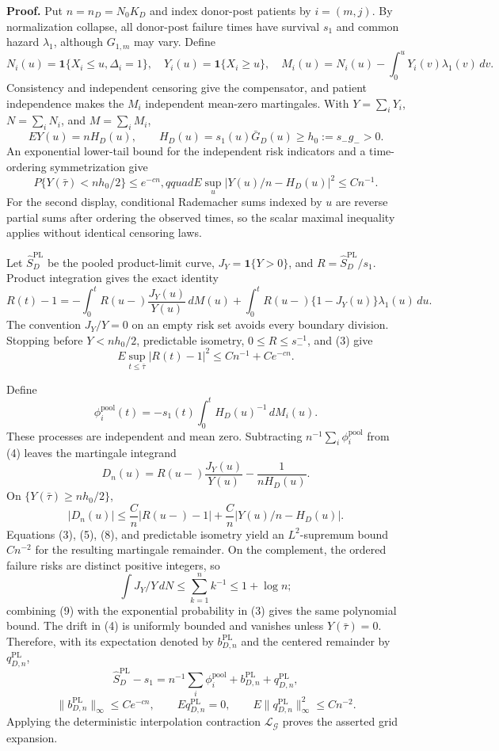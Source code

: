 \textbf{Proof.}
Put \(n=n_D=N_0K_D\) and index donor-post patients by \(i=(m,j)\). By normalization collapse, all donor-post failure times have survival \(s_1\) and common hazard \(\lambda_1\), although \(G_{1,m}\) may vary. Define
\[
 N_i(u)=\mathbf1\{X_i\le u,\Delta_i=1\},\quad
 Y_i(u)=\mathbf1\{X_i\ge u\},\quad
 M_i(u)=N_i(u)-\int_0^uY_i(v)\lambda_1(v)\,dv.            \tag{1}
\]
Consistency and independent censoring give the compensator, and patient independence makes the \(M_i\) independent mean-zero martingales. With \(Y=\sum_iY_i\), \(N=\sum_iN_i\), and \(M=\sum_iM_i\),
\[
 EY(u)=nH_D(u),\qquad H_D(u)=s_1(u)\bar G_D(u)\ge h_0:=s_-g_->0. \tag{2}
\]
An exponential lower-tail bound for the independent risk indicators and a time-ordering symmetrization give
\[
 P\{Y(\bar\tau)<nh_0/2\}\le e^{-cn},qquad
 E\sup_u|Y(u)/n-H_D(u)|^2\le Cn^{-1}.                    \tag{3}
\]
For the second display, conditional Rademacher sums indexed by \(u\) are reverse partial sums after ordering the observed times, so the scalar maximal inequality applies without identical censoring laws.

Let \(\widehat S_D^{\mathrm{PL}}\) be the pooled product-limit curve, \(J_Y=\mathbf1\{Y>0\}\), and \(R=\widehat S_D^{\mathrm{PL}}/s_1\). Product integration gives the exact identity
\[
 R(t)-1=-\int_0^tR(u-)\frac{J_Y(u)}{Y(u)}\,dM(u)
 +\int_0^tR(u-)\{1-J_Y(u)\}\lambda_1(u)\,du.             \tag{4}
\]
The convention \(J_Y/Y=0\) on an empty risk set avoids every boundary division. Stopping before \(Y<nh_0/2\), predictable isometry, \(0\le R\le s_-^{-1}\), and (3) give
\[
 E\sup_{t\le\bar\tau}|R(t)-1|^2\le Cn^{-1}+Ce^{-cn}.     \tag{5}
\]

Define
\[
 \phi_i^{\mathrm{pool}}(t)=-s_1(t)\int_0^tH_D(u)^{-1}\,dM_i(u). \tag{6}
\]
These processes are independent and mean zero. Subtracting \(n^{-1}\sum_i\phi_i^{\mathrm{pool}}\) from (4) leaves the martingale integrand
\[
 D_n(u)=R(u-)\frac{J_Y(u)}{Y(u)}-\frac1{nH_D(u)}.          \tag{7}
\]
On \(\{Y(\bar\tau)\ge nh_0/2\}\),
\[
 |D_n(u)|\le \frac{C}{n}|R(u-)-1|
 +\frac{C}{n}|Y(u)/n-H_D(u)|.                             \tag{8}
\]
Equations (3), (5), (8), and predictable isometry yield an \(L^2\)-supremum bound \(Cn^{-2}\) for the resulting martingale remainder. On the complement, the ordered failure risks are distinct positive integers, so
\[
 \int J_Y/Y\,dN\le\sum_{k=1}^nk^{-1}\le1+\log n;         \tag{9}
\]
combining (9) with the exponential probability in (3) gives the same polynomial bound. The drift in (4) is uniformly bounded and vanishes unless \(Y(\bar\tau)=0\). Therefore, with its expectation denoted by \(b_{D,n}^{\mathrm{PL}}\) and the centered remainder by \(q_{D,n}^{\mathrm{PL}}\),
\[
 \widehat S_D^{\mathrm{PL}}-s_1
 =n^{-1}\sum_i\phi_i^{\mathrm{pool}}
 +b_{D,n}^{\mathrm{PL}}+q_{D,n}^{\mathrm{PL}},             \tag{10}
\]
\[
 \|b_{D,n}^{\mathrm{PL}}\|_\infty\le Ce^{-cn},\qquad
 Eq_{D,n}^{\mathrm{PL}}=0,\qquad
 E\|q_{D,n}^{\mathrm{PL}}\|_\infty^2\le Cn^{-2}.         \tag{11}
\]
Applying the deterministic interpolation contraction \(\mathcal L_{\mathcal G}\) proves the asserted grid expansion.

